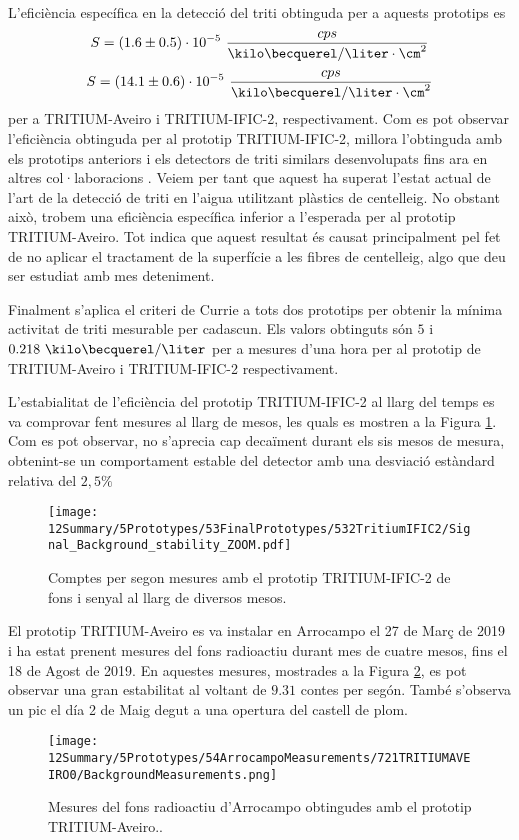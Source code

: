 L'eficiència específica en la detecció del triti obtinguda per a aquests prototips es
$$S = (1.6 \pm 0.5)\cdot{} 10^{-5}~\frac{cps}{\kilo\becquerel/\liter \cdot{} \cm^{2}}$$
$$S = (14.1 \pm 0.6)\cdot{} 10^{-5}~\frac{cps}{\kilo\becquerel/\liter \cdot{} \cm^{2}}$$
per a TRITIUM-Aveiro i TRITIUM-IFIC-2, respectivament. Com es pot observar l'eficiència obtinguda per al prototip TRITIUM-IFIC-2, millora l'obtinguda amb els prototips anteriors i els detectors de triti similars desenvolupats fins ara en altres col·laboracions \cite{Hofstetter1, Hofstetter2}. Veiem per tant que aquest ha superat l'estat actual de l'art de la detecció de triti en l'aigua utilitzant plàstics de centelleig. No obstant això, trobem una eficiència específica inferior a l'esperada per al prototip TRITIUM-Aveiro. Tot indica que aquest resultat és causat principalment pel fet de no aplicar el tractament de la superfície a les fibres de centelleig, algo que deu ser estudiat amb mes deteniment.

Finalment s'aplica el criteri de Currie \cite{Knoll} a tots dos prototips per obtenir la mínima activitat de triti mesurable per cadascun. Els valors obtinguts són $5$ i $0.218~\kilo\becquerel/\liter$ per a mesures d'una hora per al prototip de TRITIUM-Aveiro i TRITIUM-IFIC-2 respectivament. 

L'estabialitat de l'eficiència del prototip TRITIUM-IFIC-2 al llarg del temps es va comprovar fent mesures al llarg de mesos, les quals es mostren a la Figura \ref{fig:MonitoritzacioTRITIUMIFIC2}. Com es pot observar, no s'aprecia cap decaïment durant els sis mesos de mesura, obtenint-se un comportament estable del detector amb una desviació estàndard relativa del $2,5\%$

\begin{figure}[h]
\centering
\texttt{[image: 12Summary/5Prototypes/53FinalPrototypes/532TritiumIFIC2/Signal\_Background\_stability\_ZOOM.pdf]}
\caption{Comptes per segon mesures amb el prototip TRITIUM-IFIC-2 de fons i senyal al llarg de diversos mesos.\label{fig:MonitoritzacioTRITIUMIFIC2}}
\end{figure}

El prototip TRITIUM-Aveiro es va instalar en Arrocampo el 27 de Març de 2019 i ha estat prenent mesures del fons radioactiu durant mes de cuatre mesos, fins el 18 de Agost de 2019. En aquestes mesures, mostrades a la Figura \ref{fig:FonsArrocampoAveiro}, es pot observar una gran estabilitat al voltant de $9.31$ contes per segón. També s'observa un pic el día 2 de Maig degut a una opertura del castell de plom.

\begin{figure}[h]
\centering
\texttt{[image: 12Summary/5Prototypes/54ArrocampoMeasurements/721TRITIUMAVEIRO0/BackgroundMeasurements.png]}
\caption{Mesures del fons radioactiu d'Arrocampo obtingudes amb el prototip TRITIUM-Aveiro.\cite{ExperimentalPaperCarlos}.\label{fig:FonsArrocampoAveiro}}
\end{figure}